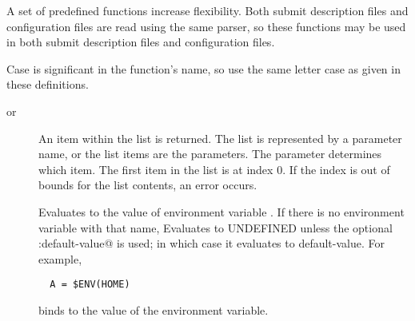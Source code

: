 
A set of predefined functions increase flexibility.
Both submit description files and configuration files are read using
the same parser,
so these functions may be used in both submit description files and
configuration files.

Case is significant in the function's name, so use the
same letter case as given in these definitions.

\begin{description}

\item [ 
       or ]
An item within the list is returned.
The list is represented by a parameter name,
or the list items are the parameters.
The  parameter determines which item.
The first item in the list is at index 0.
If the index is out of bounds for the list contents, 
an error occurs.


\item []
Evaluates to the value of environment variable 
. If there is no environment variable with that name, Evaluates
to UNDEFINED unless the optional \verb@:default-value@ is used; in which case it evaluates to default-value.
For example, 
\begin{verbatim}
  A = $ENV(HOME)
\end{verbatim}
binds  to the value of the  environment variable.


\end{description}
